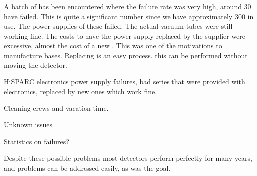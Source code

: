 A batch of \pmts has been encountered where the failure rate was very high, around 30 \pmts have failed. This is quite a significant number since we have approximately 300 \pmts in use. The power supplies of these \pmts failed. The actual vacuum tubes were still working fine. The costs to have the power supply replaced by the supplier were excessive, almost the cost of a new \pmt. This was one of the motivations to manufacture \pmt bases. Replacing \pmts is an easy process, this can be performed without moving the detector.

HiSPARC electronics power supply failures, bad series that were provided with electronics, replaced by new ones which work fine.

Cleaning crews and vacation time.

Unknown issues

Statistics on failures?

Despite these possible problems most detectors perform perfectly for many years, and problems can be addressed easily, as was the goal.

